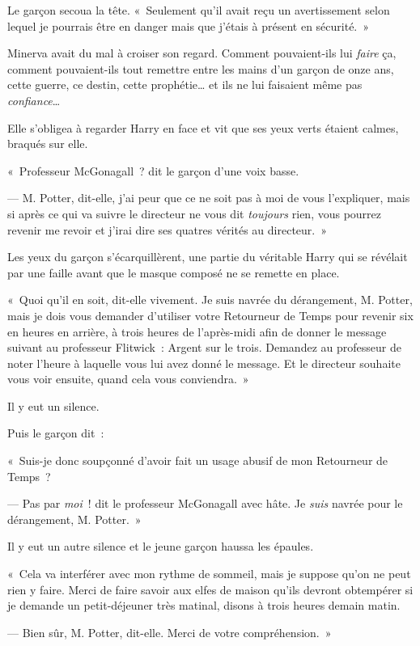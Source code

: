 Le garçon secoua la tête. «~Seulement qu'il avait reçu un avertissement selon lequel je pourrais être en danger mais que j'étais à présent en sécurité.~»

Minerva avait du mal à croiser son regard. Comment pouvaient-ils lui \emph{faire} ça, comment pouvaient-ils tout remettre entre les mains d'un garçon de onze ans, cette guerre, ce destin, cette prophétie… et ils ne lui faisaient même pas \emph{confiance}…

Elle s'obligea à regarder Harry en face et vit que ses yeux verts étaient calmes, braqués sur elle.

«~Professeur McGonagall~? dit le garçon d'une voix basse.

--- M. Potter, dit-elle, j'ai peur que ce ne soit pas à moi de vous l'expliquer, mais si après ce qui va suivre le directeur ne vous dit \emph{toujours} rien, vous pourrez revenir me revoir et j'irai dire ses quatres vérités au directeur.~»

Les yeux du garçon s'écarquillèrent, une partie du véritable Harry qui se révélait par une faille avant que le masque composé ne se remette en place.

«~Quoi qu'il en soit, dit-elle vivement. Je suis navrée du dérangement, M. Potter, mais je dois vous demander d'utiliser votre Retourneur de Temps pour revenir six en heures en arrière, à trois heures de l'après-midi afin de donner le message suivant au professeur Flitwick~: Argent sur le trois. Demandez au professeur de noter l'heure à laquelle vous lui avez donné le message. Et le directeur souhaite vous voir ensuite, quand cela vous conviendra.~»

Il y eut un silence.

Puis le garçon dit~:

«~Suis-je donc soupçonné d'avoir fait un usage abusif de mon Retourneur de Temps~?

--- Pas par \emph{moi}~! dit le professeur McGonagall avec hâte. Je \emph{suis} navrée pour le dérangement, M. Potter.~»

Il y eut un autre silence et le jeune garçon haussa les épaules.

«~Cela va interférer avec mon rythme de sommeil, mais je suppose qu'on ne peut rien y faire. Merci de faire savoir aux elfes de maison qu'ils devront obtempérer si je demande un petit-déjeuner très matinal, disons à trois heures demain matin.

--- Bien sûr, M. Potter, dit-elle. Merci de votre compréhension.~»

